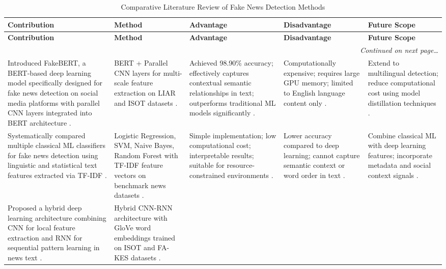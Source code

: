 \begin{longtable}{|p{}|p{}|p{}|p{}|p{}|}
\caption{Comparative Literature Review of Fake News Detection Methods} \label{tab:litreview} \\
\hline
\textbf{Contribution} & \textbf{Method} & \textbf{Advantage} & \textbf{Disadvantage} & \textbf{Future Scope} \\ \hline
\endfirsthead
\hline
\textbf{Contribution} & \textbf{Method} & \textbf{Advantage} & \textbf{Disadvantage} & \textbf{Future Scope} \\ \hline
\endhead
\hline
\multicolumn{5}{r}{\small\textit{Continued on next page\ldots}} \\
\endfoot
\hline
\endlastfoot
Introduced FakeBERT, a BERT-based deep learning model specifically designed for fake news detection on social media platforms with parallel CNN layers integrated into BERT architecture \cite{Kaliyar2021FakeBERT}. &
BERT + Parallel CNN layers for multi-scale feature extraction on LIAR and ISOT datasets \cite{Kaliyar2021FakeBERT}. &
Achieved 98.90\% accuracy; effectively captures contextual semantic relationships in text; outperforms traditional ML models significantly \cite{Kaliyar2021FakeBERT}. &
Computationally expensive; requires large GPU memory; limited to English language content only \cite{Kaliyar2021FakeBERT}. &
Extend to multilingual detection; reduce computational cost using model distillation techniques \cite{Kaliyar2021FakeBERT}. \\ \hline
Systematically compared multiple classical ML classifiers for fake news detection using linguistic and statistical text features extracted via TF-IDF \cite{Aphiwongsophon2021Detecting}. &
Logistic Regression, SVM, Naive Bayes, Random Forest with TF-IDF feature vectors on benchmark news datasets \cite{Aphiwongsophon2021Detecting}. &
Simple implementation; low computational cost; interpretable results; suitable for resource-constrained environments \cite{Aphiwongsophon2021Detecting}. &
Lower accuracy compared to deep learning; cannot capture semantic context or word order in text \cite{Aphiwongsophon2021Detecting}. &
Combine classical ML with deep learning features; incorporate metadata and social context signals \cite{Aphiwongsophon2021Detecting}. \\ \hline
Proposed a hybrid deep learning architecture combining CNN for local feature extraction and RNN for sequential pattern learning in news text \cite{Nasir2021FakeNews}. &
Hybrid CNN-RNN architecture with GloVe word embeddings trained on ISOT and FA-KES datasets \cite{Nasir2021FakeNews}. &

\end{longtable}
